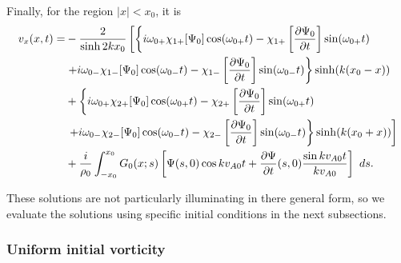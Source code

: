 \documentclass[12pt]{../style-files/ociamthesis}
\begin{document}
Finally, for the region $|x|<x_0$, it is
\begin{align}
v_x(x, t) =& -\frac{2}{\sinh{2kx_0}} \left[ \left\{ i\omega_{0+}\chi_{1+}[\Psi_0] \cos(\omega_{0+} t) - \chi_{1+}\left[ \frac{\partial \Psi_0}{\partial t} \right] \sin(\omega_{0+} t) \right. \right. \notag \\
& \left. + i\omega_{0-}\chi_{1-}[\Psi_0] \cos(\omega_{0-} t) - \chi_{1-}\left[ \frac{\partial \Psi_0}{\partial t} \right] \sin(\omega_{0-} t) \right\} \sinh(k(x_0 - x)) \notag \\ 
& + \left\{ i\omega_{0+}\chi_{2+}[\Psi_0] \cos(\omega_{0+} t) - \chi_{2+}\left[ \frac{\partial \Psi_0}{\partial t} \right] \sin(\omega_{0+} t) \right. \notag \\
& \left. \left. + i\omega_{0-}\chi_{2-}[\Psi_0] \cos(\omega_{0-} t) - \chi_{2-}\left[ \frac{\partial \Psi_0}{\partial t} \right] \sin(\omega_{0-} t) \right\} \sinh(k(x_0 + x)) \right] \notag \\
& + \frac{i}{\rho_0} \int_{-x_0}^{x_0} G_0(x;s) \left[ \Psi(s, 0) \cos{kv_{A0}t} + \frac{\partial \Psi}{\partial t}(s, 0) \frac{\sin{kv_{A0}t}}{kv_{A0}} \right]~ds.
\end{align}

These solutions are not particularly illuminating in there general form, so we evaluate the solutions using specific initial conditions in the next subsections.


\subsubsection{Uniform initial vorticity}
\end{document}
